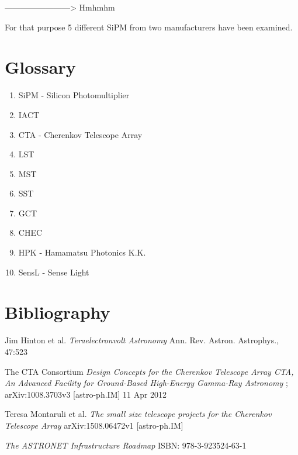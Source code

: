 \documentclass[12pt,article,type=msc,colorback,accentcolor=tud9c]{tudthesis}
\begin{document}
{------------------------>
Hmhmhm

For that purpose 5 different SiPM from two manufacturers have been examined.

\newpage
\section{\Large Glossary}
\begin{enumerate}
\item SiPM - Silicon Photomultiplier
\item IACT
\item CTA - Cherenkov Telescope Array
\item LST
\item MST
\item SST
\item GCT
\item CHEC



\item HPK - Hamamatsu Photonics K.K.
\item SensL - Sense Light
\end{enumerate}


\newpage
\section{\Large Bibliography}
\begin{thebibliography}{12}

 Jim Hinton et al. \textit{Teraelectronvolt Astronomy} Ann. Rev. Astron. Astrophys., 47:523



 The CTA Consortium \textit{Design Concepts for the Cherenkov Telescope Array CTA, An Advanced Facility for Ground-Based High-Energy Gamma-Ray Astronomy} ; arXiv:1008.3703v3 [astro-ph.IM] 11 Apr 2012

 Teresa Montaruli et al. \textit{The small size telescope projects for the Cherenkov Telescope Array} arXiv:1508.06472v1 [astro-ph.IM]

 \textit{The ASTRONET Infrastructure Roadmap} ISBN: 978-3-923524-63-1


\end{thebibliography}}
\end{document}
